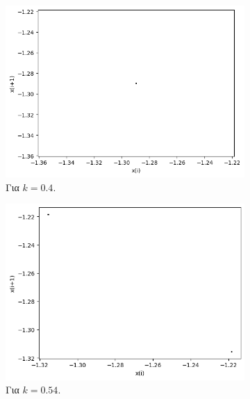 \begin{figure}[h!]
	\centering
	
	\begin{subfigure}[b]{0.4\textwidth}
		\centering
		\includegraphics[width=\textwidth]{LateX images/graphs q14/g11}
		\caption{Για $k=0.4$.}
		\label{f:k}
	\end{subfigure}
	\hfill
	\begin{subfigure}[b]{0.4\textwidth}
		\centering
		\includegraphics[width=\textwidth]{LateX images/graphs q14/g12}
		\caption{Για $k=0.54$.}
		\label{f:k69}
	\end{subfigure}
	\hfill
	\begin{subfigure}[b]{0.4\textwidth}
		\centering

\end{subfigure}
\end{figure}
